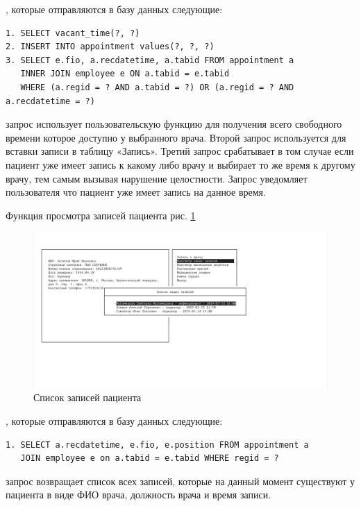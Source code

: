 \documentclass[14pt,a4paper,russian]{extreport}
\begin{document}
\newpage
{}, которые отправляются в базу данных следующие:
\begin{lstlisting}[style=csql] 
1. SELECT vacant_time(?, ?)
2. INSERT INTO appointment values(?, ?, ?)
3. SELECT e.fio, a.recdatetime, a.tabid FROM appointment a 
   INNER JOIN employee e ON a.tabid = e.tabid 
   WHERE (a.regid = ? AND a.tabid = ?) OR (a.regid = ? AND a.recdatetime = ?)
\end{lstlisting}
 запрос использует пользовательскую функцию для получения всего свободного времени которое доступно у выбранного врача.
Второй запрос используется для вставки записи в таблицу «Запись».
Третий запрос срабатывает в том случае если пациент уже имеет запись к какому либо врачу и выбирает то же время к другому врачу, тем самым вызывая нарушение целостности. Запрос уведомляет пользователя что пациент уже имеет запись на данное время.\par\par

Функция просмотра записей пациента рис. \ref{fig:appointments-show}
\begin{figure}[h!]
        \includegraphics[width=\textwidth]{prog_int/appointments-show}
        \caption{Список записей пациента}
        \label{fig:appointments-show}
\end{figure}
, которые отправляются в базу данных следующие:
\begin{lstlisting}[style=csql] 
1. SELECT a.recdatetime, e.fio, e.position FROM appointment a
   JOIN employee e on a.tabid = e.tabid WHERE regid = ? 
\end{lstlisting}
 запрос возвращает список всех записей, которые на данный момент существуют у пациента в виде ФИО врача, должность врача и время записи.\par\par
\end{document}
